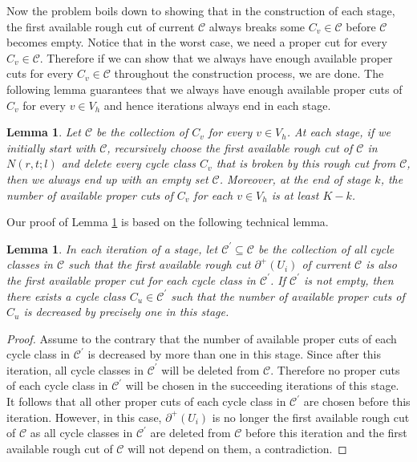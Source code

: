 \documentclass[11pt]{article}
\newtheorem{lemma}[theorem]{Lemma}
\begin{document}
Now the problem boils down to showing that in the construction of each stage, the first available rough cut of current $\mathcal{C}$ always breaks some $C_v\in\mathcal{C}$ before $\mathcal{C}$ becomes empty. Notice that in the worst case, we need a proper cut for every $C_v\in\mathcal{C}$. Therefore if we can show that we always have enough available proper cuts for every $C_v\in \mathcal{C}$ throughout the construction process, we are done. The following lemma guarantees that we always have enough available proper cuts of $C_v$ for every $v\in V_h$ and hence iterations always end in each stage.

\begin{lemma} 
\label{lem:3}
Let $\mathcal{C}$ be the collection of $C_v$ for every $v\in V_h$. At each stage, if we initially start with $\mathcal{C}$, recursively choose the first available rough cut of $\mathcal{C}$ in $N(r,t;l)$ and delete every cycle class $C_v$ that is broken by this rough cut from $\mathcal{C}$, then we always end up with an empty set $\mathcal{C}$. Moreover, at the end of stage $k$, the number of available proper cuts of $C_v$ for each $v\in V_h$ is at least $K-k$.
\end{lemma}

Our proof of Lemma \ref{lem:3} is based on the following technical lemma. 

\begin{lemma}
\label{lem:4} 
In each iteration of a stage, let $\mathcal{C}^\prime\subseteq\mathcal{C}$ be the collection of all cycle classes in $\mathcal{C}$ such that the first available rough cut $\partial^+(U_i)$ of current $\mathcal{C}$ is also the first available proper cut for each cycle class in $\mathcal{C}^\prime$. If $\mathcal{C}^\prime$ is not empty, then there exists a cycle class $C_u\in \mathcal{C}^\prime$ such that the number of available proper cuts of $C_u$ is decreased by precisely one in this stage.
\end{lemma}

\begin{proof}
Assume to the contrary that the number of available proper cuts of each cycle class in $\mathcal{C}^\prime$ is decreased by more than one in this stage. Since after this iteration, all cycle classes in $\mathcal{C}^\prime$ will be deleted from $\mathcal{C}$. Therefore no proper cuts of each cycle class in $\mathcal{C}^\prime$ will be chosen in the succeeding iterations of this stage. It follows that all other proper cuts of each cycle class in $\mathcal{C}^\prime$ are chosen before this iteration. However, in this case, $\partial^+(U_i)$ is no longer the first available rough cut of $\mathcal{C}$ as all cycle classes in $\mathcal{C}^\prime$ are deleted from $\mathcal{C}$ before this iteration and the first available rough cut of $\mathcal{C}$ will not depend on them, a contradiction.
\end{proof}
\end{document}
